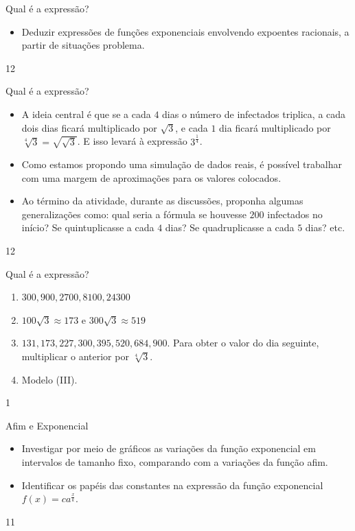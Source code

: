 \clearmargin
\begin{objectives}{Qual é a expressão?}
{
\begin{itemize}
\item Deduzir expressões de funções exponenciais envolvendo expoentes racionais, a partir de situações problema.

\end{itemize}
}{1}{2}
\end{objectives}
\begin{sugestions}{Qual é a expressão?}
{
\begin{itemize}
\item A ideia central é que se a cada $4$ dias o número de infectados triplica, a cada dois dias ficará multiplicado por $\sqrt{3}$, e cada $1$ dia ficará multiplicado por $\sqrt[4]{3}=\sqrt{\sqrt{3}}$. E isso levará à expressão $3^{\frac 14}$.

\item Como estamos propondo uma simulação de dados reais, é possível trabalhar com uma margem de aproximações para os valores colocados.

\item Ao término da atividade, durante as discussões, proponha algumas generalizações como: qual seria a fórmula se houvesse $200$ infectados no início? Se quintuplicasse a cada $4$ dias? Se quadruplicasse a cada $5$ dias? etc.

\end{itemize}
}{1}{2}
\end{sugestions}
\begin{answer}{Qual é a expressão?}
{
\begin{enumerate}

\item $300, 900, 2700, 8100, 24300$

\item $100\sqrt{3} \approx 173$ e $300\sqrt{3} \approx 519$

\item $131, 173, 227, 300, 395, 520, 684, 900$. Para obter o valor do dia seguinte, multiplicar o anterior por $\sqrt[4]{3}$.

\item Modelo (III).
\end{enumerate}
}{1}
\end{answer}
\clearmargin
\begin{objectives}{Afim e Exponencial}
{
\begin{itemize}
\item Investigar por meio de gráficos as variações da função exponencial em intervalos de tamanho fixo, comparando com a variações da função afim.

\item Identificar os papéis das constantes na expressão da função exponencial $f(x)=ca^{\frac xk}$.

\end{itemize}
}{1}{1}
\end{objectives}

